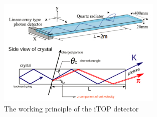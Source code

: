 \documentclass[a4paper,11pt]{article}
\begin{document}
\begin{figure}
\begin{center}
\begin{minipage}{1\textwidth}
\includegraphics[width=0.7\textwidth]{pictures/BelleIIBPID3.jpg}
\caption{The working principle of the iTOP detector}
\label{fig:iTOP}
\end{minipage}
\end{center}
\end{figure}
\end{document}
